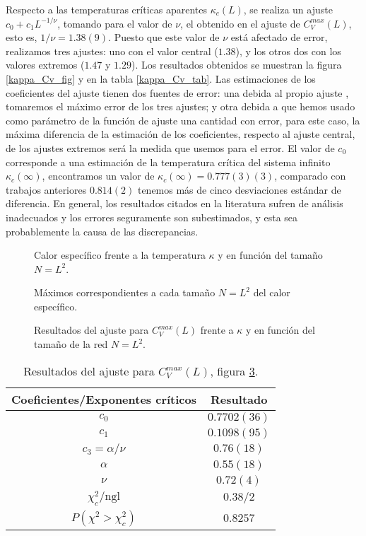 Respecto a las temperaturas críticas aparentes $\kappa_c(L)$, se realiza un
ajuste $c_0+c_1L^{-1/\nu}$, tomando para el valor de $\nu$, el obtenido en el
ajuste de $C_V^{max}(L)$, esto es, $1/\nu=1.38(9)$. Puesto que este valor de
$\nu$ está afectado de error, realizamos tres ajustes: uno con el valor
central ($1.38$), y los otros dos con los valores extremos ($1.47$ y
$1.29$). Los resultados obtenidos se muestran 
la figura \ref{kappa_Cv_fig} y en la tabla \ref{kappa_Cv_tab}. Las
estimaciones de los coeficientes del ajuste 
tienen dos fuentes de error: una debida al propio ajuste  
, tomaremos el máximo error de los tres ajustes; y otra debida a que hemos
usado como parámetro de la función de ajuste una cantidad con error, para este caso, la
máxima diferencia de la estimación de los coeficientes, respecto al ajuste central, de los
ajustes extremos será la medida que usemos para el error. El valor
de $c_0$ corresponde a una estimación de la temperatura crítica del sistema
infinito $\kappa_c(\infty)$, encontramos un valor de
$\kappa_c(\infty)=0.777(3)(3)$, comparado con trabajos anteriores $0.814(2)$
\cite{Wheater_Critical_exponents} tenemos más de cinco desviaciones estándar
de diferencia. En general, los resultados citados en la literatura sufren de
análisis inadecuados y los errores seguramente son subestimados, y esta sea
probablemente la causa de las discrepancias.

\begin{figure}[h]
  \centering
  
  \caption{Calor específico frente a la temperatura $\kappa$ y en función del
    tamaño $N=L^2$.}\label{Cv_fig}
\end{figure}

\begin{figure}[h]
  \centering
  
  \caption{Máximos correspondientes a cada tamaño $N=L^2$ del calor específico.}\label{max_Cv_fig}
\end{figure}
\clearpage
\begin{figure}[h]
  \centering
  
  \caption{Resultados del ajuste para $C_V^{max}(L)$ frente a $\kappa$ y en
    función del tamaño de la red $N=L^2$.}\label{max_Cv_L_fig}
\end{figure}

\begin{table}[h]
\centering
\begin{tabular}{|c|c|}\hline
 Coeficientes/Exponentes críticos & Resultado \\\hline
 $c_0$         & $0.7702(36) $ \\ \hline
 $c_1$         & $0.1098(95)$ \\ \hline
 $c_3=\alpha/\nu$  & $0.76(18)$  \\ \hline
$\alpha$      & $0.55(18)$ \\ \hline
$\nu $        & $0.72(4)$ \\ \hline
$\chi_c^2/\mathrm{ngl}$ &  $0.38/2$   \\ \hline
 $P(\chi^2>\chi_c^2)$&  $0.8257$\\ \hline
\end{tabular}
\caption{Resultados del ajuste para $C_V^{max}(L)$, figura \ref{max_Cv_L_fig}.}\label{max_Cv_L_tab}
\end{table}

